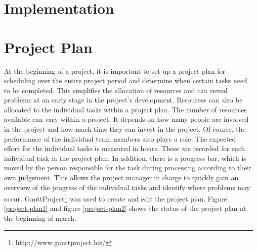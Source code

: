 \section{Implementation}
\label{sec:orgaa7b811}


\section{Project Plan}
\label{sec:org8452a3e}
At the beginning of a project, it is important to set up a project plan for scheduling over the entire project period and determine when certain tasks need to be completed. This simplifies the allocation of resources and can reveal problems at an early stage in the project's development. Resources can also be allocated to the individual tasks within a project plan. The number of resources available can vary within a project. It depends on how many people are involved in the project and how much time they can invest in the project. Of course, the performance of the individual team members also plays a role. The expected effort for the individual tasks is measured in hours. These are recorded for each individual task in the project plan. In addition, there is a progress bar, which is moved by the person responsible for the task during processing according to their own judgement. This allows the project manager in charge to quickly gain an overview of the progress of the individual tasks and identify where problems may occur. GanttProject\footnote{http://www.ganttproject.biz/} was used to create and edit the project plan. Figure \ref{project-plan1} and figure \ref{project-plan2} shows the status of the project plan at the beginning of march.
